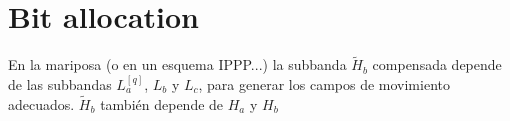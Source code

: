 
\section{Bit allocation}
En la mariposa (o en un esquema IPPP...) la subbanda $\tilde{H}_b$ compensada depende de las subbandas $L_a^{[q]}$, $L_b$ y $L_c$, para generar los campos de movimiento adecuados. $\tilde{H}_b$ también depende de $H_a$ y $H_b$ 

\begin{comment}

\subsection*{Example: Lossy compression of the MC $H$ subbands}
\begin{verbatim}
predictor=2

# You must be in the 'src' directory.
rm /tmp/*.png
cp ../sequences/stockholm/* /tmp

python3 -O MDWT.py -p /tmp/
python3 -O MCOLP.py -P $predictor -p /tmp/

quality=50
python3 ../tools/compress.py -i /tmp/LH001.png -o /tmp/LH001.png -q $quality
python3 ../tools/add_offset.py -i /tmp/LH001.png -o /tmp/LH001.png -f 32640
python3 ../tools/compress.py -i /tmp/HL001.png -o /tmp/HL001.png -q $quality
python3 ../tools/add_offset.py -i /tmp/HL001.png -o /tmp/HL001.png -f 32640
python3 ../tools/compress.py -i /tmp/HH001.png -o /tmp/HH001.png -q $quality
python3 ../tools/add_offset.py -i /tmp/HH001.png -o /tmp/HH001.png -f 32640

python3 ../tools/compress.py -i /tmp/LH002.png -o /tmp/LH002.png -q $quality
python3 ../tools/add_offset.py -i /tmp/LH002.png -o /tmp/LH002.png -f 32640
python3 ../tools/compress.py -i /tmp/HL002.png -o /tmp/HL002.png -q $quality
python3 ../tools/add_offset.py -i /tmp/HL002.png -o /tmp/HL002.png -f 32640
python3 ../tools/compress.py -i /tmp/HH002.png -o /tmp/HH002.png -q $quality
python3 ../tools/add_offset.py -i /tmp/HH002.png -o /tmp/HH002.png -f 32640

python3 ../tools/compress.py -i /tmp/LH003.png -o /tmp/LH003.png -q $quality
python3 ../tools/add_offset.py -i /tmp/LH003.png -o /tmp/LH003.png -f 32640
python3 ../tools/compress.py -i /tmp/HL003.png -o /tmp/HL003.png -q $quality
python3 ../tools/add_offset.py -i /tmp/HL003.png -o /tmp/HL003.png -f 32640
python3 ../tools/compress.py -i /tmp/HH003.png -o /tmp/HH003.png -q $quality
python3 ../tools/add_offset.py -i /tmp/HH003.png -o /tmp/HH003.png -f 32640


\end{comment}
